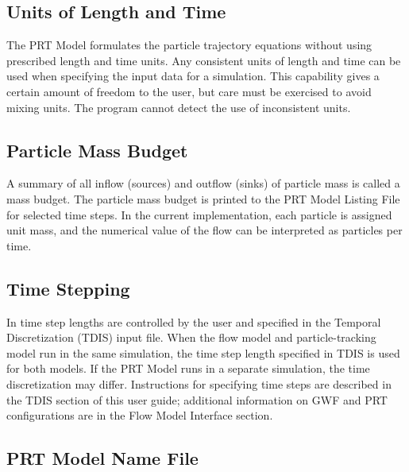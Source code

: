 \subsection{Units of Length and Time}
The PRT Model formulates the particle trajectory equations without using prescribed length and time units. Any consistent units of length and time can be used when specifying the input data for a simulation. This capability gives a certain amount of freedom to the user, but care must be exercised to avoid mixing units.  The program cannot detect the use of inconsistent units.

\subsection{Particle Mass Budget}
A summary of all inflow (sources) and outflow (sinks) of particle mass is called a mass budget.  The particle mass budget is printed to the PRT Model Listing File for selected time steps.  In the current implementation, each particle is assigned unit mass, and the numerical value of the flow can be interpreted as particles per time.

\subsection{Time Stepping}
In \mf time step lengths are controlled by the user and specified in the Temporal Discretization (TDIS) input file.  When the flow model and particle-tracking model run in the same simulation, the time step length specified in TDIS is used for both models.  If the PRT Model runs in a separate simulation, the time discretization may differ.  Instructions for specifying time steps are described in the TDIS section of this user guide; additional information on GWF and PRT configurations are in the Flow Model Interface section.  



\newpage
\subsection{PRT Model Name File}


%

%

